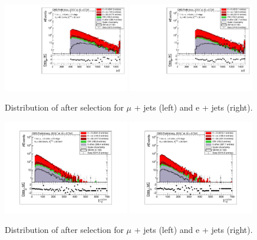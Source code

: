 \begin{figure}[ht!]
\centering
    \includegraphics[clip, trim=0.15cm 0.15cm 0.15cm 0.1cm, width=0.49\textwidth]{images/Run1/HT_SelectedJets_StackLogY_Mu.pdf}
     \includegraphics[clip, trim=0.15cm 0.15cm 0.15cm 0.1cm, width=0.49\textwidth]{images/Run1/HT_SelectedJets_StackLogY_e.pdf}          
    \caption{Distribution of \HT after selection for $\mu$ + jets (left) and e + jets (right). }
    \label{fig:datasimHT}
\end{figure}

\begin{figure}[ht!]
\centering
    \includegraphics[clip, trim=0.15cm 0.15cm 0.15cm 0.1cm, width=0.49\textwidth]{images/Run1/METmu.pdf}
     \includegraphics[clip, trim=0.15cm 0.15cm 0.15cm 0.1cm, width=0.49\textwidth]{images/Run1/METe.pdf}          
    \caption{Distribution of \MET after selection for $\mu$ + jets (left) and e + jets (right). }
    \label{fig:datasimMET}
\end{figure}

